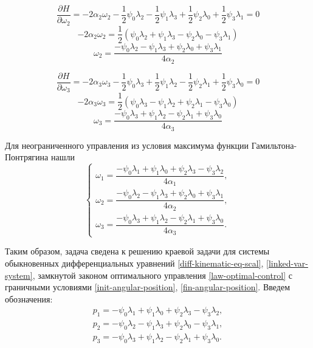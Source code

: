 \documentclass[14pt]{extreport}
\begin{document}
$$\dfrac{\partial H}{\partial \omega_2}=-2\alpha_2\omega_2-\dfrac{1}{2}\psi_0\lambda_2-\dfrac{1}{2}\psi_1\lambda_3+\dfrac{1}{2}\psi_2\lambda_0+\dfrac{1}{2}\psi_3\lambda_1=0$$
$$-2\alpha_2\omega_2=\dfrac{1}{2}(\psi_0\lambda_2+\psi_1\lambda_3-\psi_2\lambda_0-\psi_3\lambda_1)$$
$$\omega_2=\dfrac{-\psi_0\lambda_2-\psi_1\lambda_3+\psi_2\lambda_0+\psi_3\lambda_1}{4\alpha_2}$$

$$\dfrac{\partial H}{\partial \omega_3}=-2\alpha_3\omega_3-\dfrac{1}{2}\psi_0\lambda_3+\dfrac{1}{2}\psi_1\lambda_2-\dfrac{1}{2}\psi_2\lambda_1+\dfrac{1}{2}\psi_3\lambda_0=0$$
$$-2\alpha_3\omega_3=\dfrac{1}{2}(\psi_0\lambda_3-\psi_1\lambda_2+\psi_2\lambda_1-\psi_3\lambda_0)$$
$$\omega_3=\dfrac{-\psi_0\lambda_3+\psi_1\lambda_2-\psi_2\lambda_1+\psi_3\lambda_0}{4\alpha_3}$$

Для неограниченного управления из условия максимума функции Гамильтона-Понтрягина на­шли
\begin{equation}
\label{law-optimal-control}
\begin{cases}
	\omega_{1} = \dfrac{-\psi_{0}\lambda_{1} + \psi_{1}\lambda_{0} + \psi_{2}\lambda_{3} - \psi_{3}\lambda_{2}}{4\alpha_{1}},\\
	\omega_{2} = \dfrac{-\psi_{0}\lambda_{2} - \psi_{1}\lambda_{3} + \psi_{2}\lambda_{0} + \psi_{3}\lambda_{1}}{4\alpha_{2}},\\
	\omega_{3} = \dfrac{-\psi_{0}\lambda_{3} + \psi_{1}\lambda_{2} - \psi_{2}\lambda_{1} + \psi_{3}\lambda_{0}}{4\alpha_{3}}.
\end{cases}
\end{equation}

Таким образом, задача сведена к решению краевой задачи для системы обыкновенных дифференциальных уравнений \eqref{diff-kinematic-eq-scal}, \eqref{linked-var-system}, замкнутой законом оптимального управления \eqref{law-optimal-control} с граничными условиями \eqref{init-angular-position}, \eqref{fin-angular-position}.
Введем обозначения:
\begin{equation}
\label{p-i}
\begin{split}
p_{1} = -\psi_{0}\lambda_{1} + \psi_{1}\lambda_{0} + \psi_{2}\lambda_{3} - \psi_{3}\lambda_{2},\\
p_{2} = -\psi_{0}\lambda_{2} - \psi_{1}\lambda_{3} + \psi_{2}\lambda_{0} - \psi_{3}\lambda_{1},\\
p_{3} = -\psi_{0}\lambda_{3} + \psi_{1}\lambda_{2} - \psi_{2}\lambda_{1} + \psi_{3}\lambda_{0}.
\end{split}
\end{equation}
\end{document}
